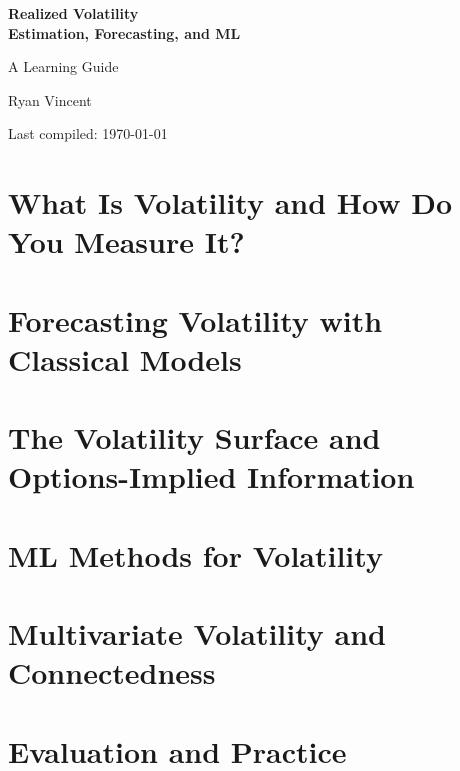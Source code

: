 \documentclass[11pt,a4paper]{report}
\begin{document}
\begin{titlepage}
\centering
\vspace*{3cm}
{\Huge\bfseries Realized Volatility\\[0.4cm]
Estimation, Forecasting, and ML\par}
\vspace{1.5cm}
{\Large A Learning Guide\par}
\vspace{1cm}
{\Large Ryan Vincent\par}
\vfill
{\small Last compiled: \today\par}
\end{titlepage}

\tableofcontents
\newpage

\part{What Is Volatility and How Do You Measure It?}





\part{Forecasting Volatility with Classical Models}




\part{The Volatility Surface and Options-Implied Information}



\part{ML Methods for Volatility}






\part{Multivariate Volatility and Connectedness}



\part{Evaluation and Practice}






\end{document}

